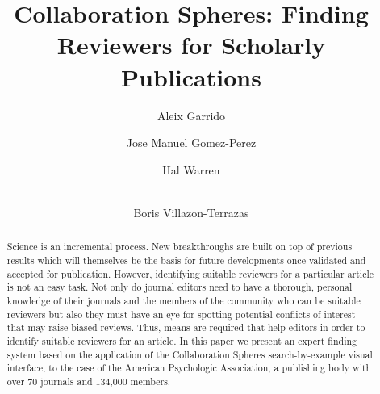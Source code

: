 \documentclass{llncs}
\begin{document}
%
\frontmatter          %
%
\pagestyle{headings}  %
%
%
\mainmatter              %
%
\title{Collaboration Spheres: Finding Reviewers for Scholarly Publications}

%
%
\author{Aleix Garrido \and Jose Manuel Gomez-Perez \and Hal Warren \and \\ Boris Villazon-Terrazas}

%
%
%


\maketitle              %



\begin{abstract}
Science is an incremental process. New breakthroughs are built on top of previous results which will themselves be the basis for future developments once validated and accepted for publication. However, identifying suitable reviewers for a particular article is not an easy task. Not only do journal editors need to have a thorough, personal knowledge of their journals and the members of the community who can be suitable reviewers but also they must have an eye for spotting potential conflicts of interest that may raise biased reviews. Thus, means are required that help editors in order to identify suitable reviewers for an article. In this paper we present an expert finding system based on the application of the Collaboration Spheres search-by-example visual interface, to the case of the American Psychologic Association, a publishing body with over 70 journals and 134,000 members. 
\end{abstract}
\end{document}
